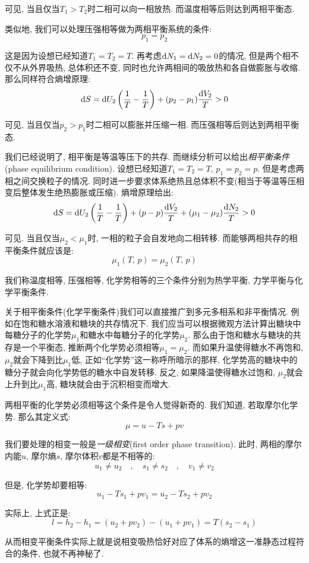 可见, 当且仅当$T_1>T_2$时二相可以向一相放热. 而温度相等后则达到两相平衡态.

类似地, 我们可以处理压强相等做为两相平衡系统的条件:
\[p_1=p_2\]

这是因为设想已经知道$T_1=T_2=T$. 再考虑$\textrm{d} N_1=\textrm{d} N_2=0$的情况, 但是两个相不仅不从外界吸热, 总体积还不变, 同时也允许两相间的吸放热和各自做膨胀与收缩. 那么同样符合熵增原理:
\[\textrm{d} S=\textrm{d} U_2\left(\frac{1}{T}-\frac{1}{T}\right)+(p_2-p_1)\frac{\textrm{d} V_2}{T}>0\]

可见, 当且仅当$p_2>p_1$时二相可以膨胀并压缩一相. 而压强相等后则达到两相平衡态.

我们已经说明了, 相平衡是等温等压下的共存. 而继续分析可以给出\emph{相平衡条件}(phase equilibrium condition). 设想已经知道$T_1=T_2=T,\, p_1=p_2=p$. 但是考虑两相之间交换粒子的情况. 同时进一步要求体系绝热且总体积不变(相当于等温等压相变后整体发生绝热膨胀或压缩). 熵增原理给出:
\[\textrm{d} S=\textrm{d} U_2\left(\frac{1}{T}-\frac{1}{T}\right)+(p-p)\frac{\textrm{d} V_2}{T}+(\mu_1-\mu_2)\frac{\textrm{d} N_2}{T}>0\]

可见. 当且仅当$\mu_2<\mu_1$时, 一相的粒子会自发地向二相转移. 而能够两相共存的相平衡条件就应该是:
\[\mu_1(T,\,p)=\mu_2(T,\,p)\]

我们称温度相等, 压强相等, 化学势相等的三个条件分别为热学平衡, 力学平衡与化学平衡条件.

关于相平衡条件(化学平衡条件)我们可以直接推广到多元多相系和非平衡情况. 例如在饱和糖水溶液和糖块的共存情况下. 我们应当可以根据微观方法计算出糖块中每糖分子的化学势$\mu_1$和糖水中每糖分子的化学势$\mu_2$. 那么由于饱和糖水与糖块的共存是一个平衡态, 推断两个化学势必须相等$\mu_1=\mu_2$. 而如果升温使得糖水不再饱和, $\mu_2$就会下降到比$\mu_1$低, 正如``化学势''这一称呼所暗示的那样, 化学势高的糖块中的糖分子就会向化学势低的糖水中自发转移. 反之, 如果降温使得糖水过饱和, $\mu_2$就会上升到比$\mu_1$高, 糖块就会由于沉积相变而增大.

两相平衡的化学势必须相等这个条件是令人觉得新奇的. 我们知道, 若取摩尔化学势. 那么其定义式:
\[\mu=u-Ts+pv\]

我们要处理的相变一般是\emph{一级相变}(first order phase transition). 此时, 两相的摩尔内能$u$, 摩尔熵$s$, 摩尔体积$v$都是不相等的:
\[u_1\neq u_2 \quad,\quad s_1\neq s_2 \quad,\quad v_1\neq v_2\]

但是, 化学势却要相等:
\[u_1-Ts_1+pv_1=u_2-Ts_2+pv_2\]

实际上, 上式正是:
\[l=h_2-h_1=(u_2+pv_2)-(u_1+pv_1)=T(s_2-s_1)\]

从而相变平衡条件实际上就是说相变吸热恰好对应了体系的熵增这一准静态过程符合的条件, 也就不再神秘了.


